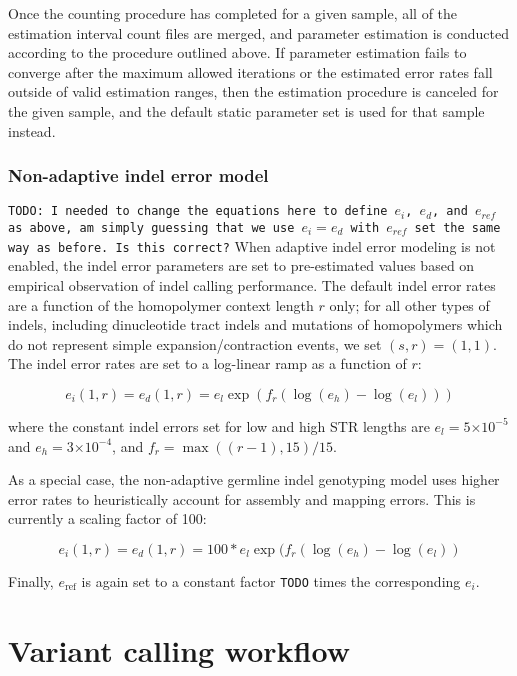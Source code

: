 \documentclass{article}
\newcommand{\e}[1]{\ensuremath{\times 10^{#1}}}
\begin{document}
Once the counting procedure has completed for a given sample, all of the estimation interval count files are merged, and parameter estimation is conducted according to the procedure outlined above. If parameter estimation fails to converge after the maximum allowed iterations or the estimated error rates fall outside of valid estimation ranges, then the estimation procedure is canceled for the given sample, and the default static parameter set is used for that sample instead.

\subsubsection{Non-adaptive indel error model}
\label{sec:non_adaptive_indel_error}
{\tt TODO: I needed to change the equations here to define $e_i$, $e_d$, and $e_{ref}$ as above, am simply guessing that we use $e_i=e_d$ with $e_{ref}$ set the same way as before. Is this correct?}
When adaptive indel error modeling is not enabled, the indel error parameters are set to pre-estimated values based on empirical observation of indel calling performance. The default indel error rates are a function of the homopolymer context length $r$ only; for all other types of indels, including dinucleotide tract indels and mutations of homopolymers which do not represent simple expansion/contraction events, we set $(s,r) = (1,1)$. The indel error rates are set to a log-linear ramp as a function of $r$:

\begin{equation*}
e_i(1,r) = e_d(1,r) = e_{l} \exp(f_r(\log(e_{h})-\log(e_{l})))
\end{equation*}

\noindent where the constant indel errors set for low and high STR lengths are $e_{l} = 5\e{-5}$ and $e_{h} = 3\e{-4}$, and $f_r = \max((r-1),15)/15$.

As a special case, the non-adaptive germline indel genotyping model uses higher error rates to heuristically account for assembly and mapping errors. This is currently a scaling factor of 100: 

\begin{equation*}
e_i(1,r) = e_d(1,r) = 100 * e_{l} \exp(f_r(\log(e_{h})-\log(e_{l}))
\end{equation*}

Finally, $e_{\text{ref}}$ is again set to a constant factor {\tt TODO} times the corresponding $e_i$.

\section{Variant calling workflow}
\end{document}
